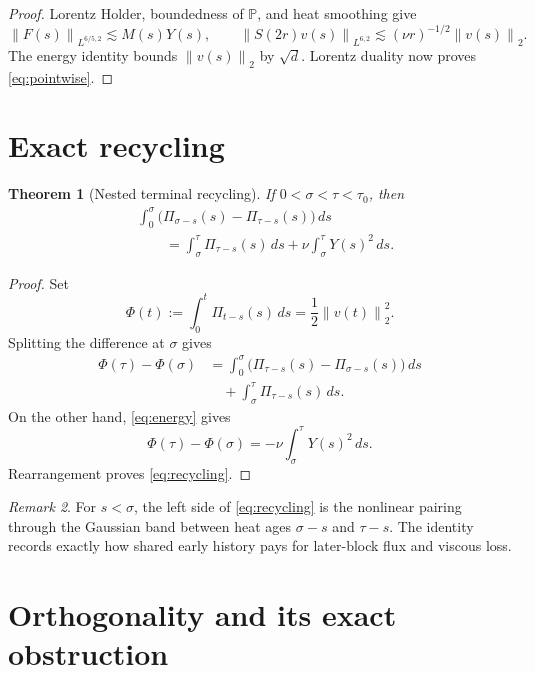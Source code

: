 \documentclass[11pt]{article}
\newtheorem{theorem}{Theorem}
\theoremstyle{remark}
\newtheorem{remark}[theorem]{Remark}
\newcommand{\Pp}{\mathbb P}
\newcommand{\norm}[1]{\left\|#1\right\|}
\begin{document}
\begin{proof}
Lorentz Holder, boundedness of \(\Pp\), and heat smoothing give
\[
 \norm{F(s)}_{L^{6/5,2}}\lesssim M(s)Y(s),
 \qquad
 \norm{S(2r)v(s)}_{L^{6,2}}
 \lesssim(\nu r)^{-1/2}\norm{v(s)}_2.
\]
The energy identity bounds \(\norm{v(s)}_2\) by \(\sqrt d\).
Lorentz duality now proves \eqref{eq:pointwise}.
\end{proof}

\section{Exact recycling}

\begin{theorem}[Nested terminal recycling]
\label{thm:recycling}
If \(0<\sigma<\tau<\tau_0\), then
\begin{equation}
\label{eq:recycling}
 \boxed{
 \begin{aligned}
 &\int_0^\sigma
 \bigl(\Pi_{\sigma-s}(s)-\Pi_{\tau-s}(s)\bigr)\,ds\\
 &\qquad=
 \int_\sigma^\tau\Pi_{\tau-s}(s)\,ds
 +\nu\int_\sigma^\tau Y(s)^2\,ds.
 \end{aligned}
 }
\end{equation}
\end{theorem}

\begin{proof}
Set
\[
 \Phi(t):=\int_0^t\Pi_{t-s}(s)\,ds
 =\frac12\norm{v(t)}_2^2.
\]
Splitting the difference at \(\sigma\) gives
\[
\begin{aligned}
 \Phi(\tau)-\Phi(\sigma)
 &=
 \int_0^\sigma
 \bigl(\Pi_{\tau-s}(s)-\Pi_{\sigma-s}(s)\bigr)\,ds\\
 &\quad+\int_\sigma^\tau\Pi_{\tau-s}(s)\,ds.
\end{aligned}
\]
On the other hand, \eqref{eq:energy} gives
\[
 \Phi(\tau)-\Phi(\sigma)
 =-\nu\int_\sigma^\tau Y(s)^2\,ds.
\]
Rearrangement proves \eqref{eq:recycling}.
\end{proof}

\begin{remark}
For \(s<\sigma\), the left side of \eqref{eq:recycling} is the
nonlinear pairing through the Gaussian band between heat ages
\(\sigma-s\) and \(\tau-s\).  The identity records exactly how shared
early history pays for later-block flux and viscous loss.
\end{remark}

\section{Orthogonality and its exact obstruction}
\end{document}
